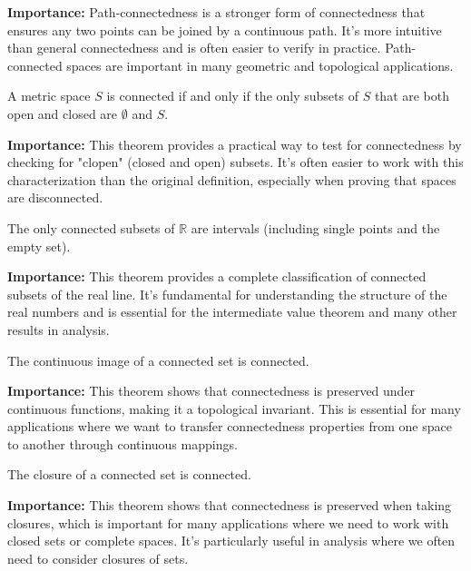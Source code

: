 \noindent\textbf{Importance:} Path-connectedness is a stronger form of connectedness that ensures any two points can be joined by a continuous path. It's more intuitive than general connectedness and is often easier to verify in practice. Path-connected spaces are important in many geometric and topological applications.



\begin{theorem}
A metric space $S$ is connected if and only if the only subsets of $S$ that are both open and closed are $\emptyset$ and $S$.
\end{theorem}

\noindent\textbf{Importance:} This theorem provides a practical way to test for connectedness by checking for "clopen" (closed and open) subsets. It's often easier to work with this characterization than the original definition, especially when proving that spaces are disconnected.



\begin{theorem}
The only connected subsets of $\mathbb{R}$ are intervals (including single points and the empty set).
\end{theorem}

\noindent\textbf{Importance:} This theorem provides a complete classification of connected subsets of the real line. It's fundamental for understanding the structure of the real numbers and is essential for the intermediate value theorem and many other results in analysis.



\begin{theorem}
The continuous image of a connected set is connected.
\end{theorem}

\noindent\textbf{Importance:} This theorem shows that connectedness is preserved under continuous functions, making it a topological invariant. This is essential for many applications where we want to transfer connectedness properties from one space to another through continuous mappings.



\begin{theorem}
The closure of a connected set is connected.
\end{theorem}

\noindent\textbf{Importance:} This theorem shows that connectedness is preserved when taking closures, which is important for many applications where we need to work with closed sets or complete spaces. It's particularly useful in analysis where we often need to consider closures of sets.





